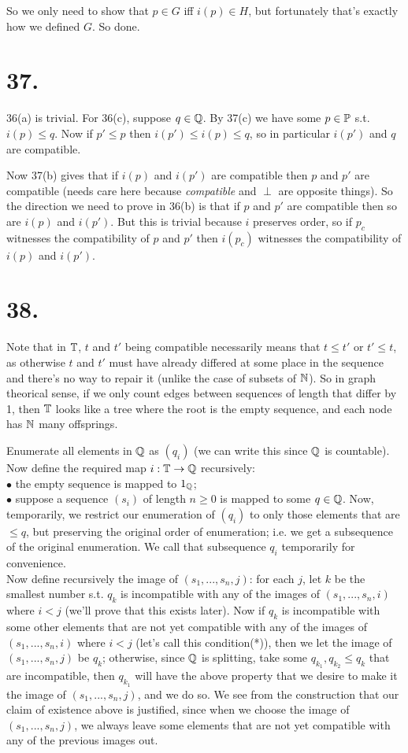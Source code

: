 \documentclass[a4paper]{article}
\begin{document}
So we only need to show that $p \in G$ iff $i(p) \in H$, but fortunately that's exactly how we defined $G$. So done.

\section*{37.}
36(a) is trivial. For 36(c), suppose $q \in \Q$. By 37(c) we have some $p \in \P$ s.t. $i(p) \leq q$. Now if $p' \leq p$ then $i(p') \leq i(p) \leq q$, so in particular $i(p')$ and $q$ are compatible.

Now 37(b) gives that if $i(p)$ and $i(p')$ are compatible then $p$ and $p'$ are compatible (needs care here because \emph{compatible} and $\perp$ are opposite things). So the direction we need to prove in 36(b) is that if $p$ and $p'$ are compatible then so are $i(p)$ and $i(p')$. But this is trivial because $i$ preserves order, so if $p_c$ witnesses the compatibility of $p$ and $p'$ then $i(p_c)$ witnesses the compatibility of $i(p)$ and $i(p')$.

\section*{38.}
Note that in $\T$, $t$ and $t'$ being compatible necessarily means that $t\leq t'$ or $t' \leq t$, as otherwise $t$ and $t'$ must have already differed at some place in the sequence and there's no way to repair it (unlike the case of subsets of $\N$). So in graph theorical sense, if we only count edges between sequences of length that differ by 1, then $\T$ looks like a tree where the root is the empty sequence, and each node has $\N$ many offsprings.

Enumerate all elements in $\Q$ as $(q_i)$ (we can write this since $\Q$ is countable). Now define the required map $i:\T \to \Q$ recursively:\\
$\bullet$ the empty sequence is mapped to $1_\Q$;\\
$\bullet$ suppose a sequence $(s_i)$ of length $n \geq 0$ is mapped to some $q \in \Q$. Now, temporarily, we restrict our enumeration of $(q_i)$ to only those elements that are $\leq q$, but preserving the original order of enumeration; i.e. we get a subsequence of the original enumeration. We call that subsequence $q_i$ temporarily for convenience.\\
Now define recursively the image of $(s_1,...,s_n,j)$: for each $j$, let $k$ be the smallest number s.t. $q_k$ is incompatible with any of the images of $(s_1,...,s_n,i)$ where $i<j$ (we'll prove that this exists later). Now if $q_k$ is incompatible with some other elements that are not yet compatible with any of the images of $(s_1,...,s_n,i)$ where $i<j$ (let's call this condition(*)), then we let the image of $(s_1,...,s_n,j)$ be $q_k$; otherwise, since $\Q$ is splitting, take some $q_{k_1},q_{k_2} \leq q_k$ that are incompatible, then $q_{k_1}$ will have the above property that we desire to make it the image of $(s_1,...,s_n,j)$, and we do so. We see from the construction that our claim of existence above is justified, since when we choose the image of $(s_1,...,s_n,j)$, we always leave some elements that are not yet compatible with any of the previous images out.
\end{document}
